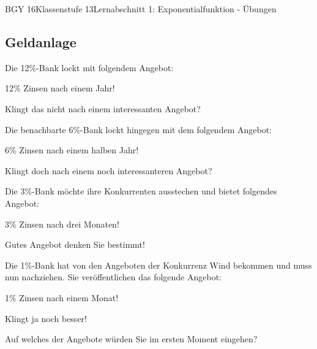 \documentclass[oneside,openany,headings=optiontotoc,11pt,numbers=noenddot]{scrreprt}
\begin{document}
\begin{worksheet}{BGY 16}{Klassenstufe 13}{Lernabschnitt 1: Exponentialfunktion - Übungen}
\begin{framed}
			\section*{Geldanlage}
			\begin{framed}
				\noindent
				Die 12\%-Bank lockt mit folgendem Angebot:\\
				\begin{center}
					\colorbox{green!15}{\Large{12\% Zinsen nach einem Jahr!}}\normalsize
				\end{center}
				\par\bigskip\noindent
				Klingt das nicht nach einem interessanten Angebot?\\
			\end{framed}
			\begin{framed}
				\noindent
				Die benachbarte 6\%-Bank lockt hingegen mit dem folgendem Angebot:\\
				\begin{center}
					\colorbox{green!15}{\Large{6\% Zinsen nach einem halben Jahr!}}\normalsize
				\end{center}
				\par\bigskip\noindent
				Klingt doch nach einem noch interessanteren Angebot?\\
			\end{framed}
			\begin{framed}
				\noindent
				Die 3\%-Bank möchte ihre Konkurrenten ausstechen und bietet folgendes Angebot:\\
				\begin{center}
					\colorbox{green!15}{\Large{3\% Zinsen nach drei Monaten!}}\normalsize
				\end{center}
				\par\bigskip\noindent
				Gutes Angebot denken Sie bestimmt!\\
			\end{framed}
			\begin{framed}
				\noindent
				Die 1\%-Bank hat von den Angeboten der Konkurrenz Wind bekommen und muss nun nachziehen. Sie veröffentlichen das folgende Angebot:\\
				\begin{center}
					\colorbox{green!15}{\Large{1\% Zinsen nach einem Monat!}}\normalsize
				\end{center}
				\par\bigskip\noindent
				Klingt ja noch besser!\\
			\end{framed}
			Auf welches der Angebote würden Sie im ersten Moment eingehen?\\

\end{framed}
\end{worksheet}
\end{document}
